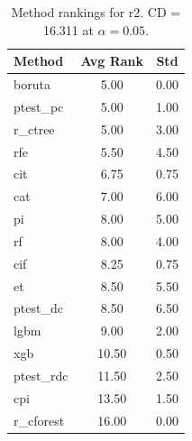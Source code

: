 \begin{table}[h]
\centering
\caption{Method rankings for r2. CD = 16.311 at $\alpha=0.05$.}
\label{tab:ranks_r2}
\begin{tabular}{lcc}
\toprule
Method & Avg Rank & Std \\
\midrule
boruta & 5.00 & 0.00 \\
ptest_pc & 5.00 & 1.00 \\
r_ctree & 5.00 & 3.00 \\
rfe & 5.50 & 4.50 \\
cit & 6.75 & 0.75 \\
cat & 7.00 & 6.00 \\
pi & 8.00 & 5.00 \\
rf & 8.00 & 4.00 \\
cif & 8.25 & 0.75 \\
et & 8.50 & 5.50 \\
ptest_dc & 8.50 & 6.50 \\
lgbm & 9.00 & 2.00 \\
xgb & 10.50 & 0.50 \\
ptest_rdc & 11.50 & 2.50 \\
cpi & 13.50 & 1.50 \\
r_cforest & 16.00 & 0.00 \\
\bottomrule
\end{tabular}
\end{table}